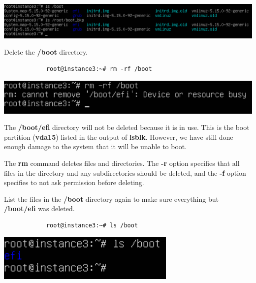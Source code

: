 \documentclass[letterpaper, 12pt]{article}
\begin{document}
\begin{enumerate}
\begin{labstep}
        \begin{center}
            \includegraphics[width=\linewidth]{images/part7/step8.png}
        \end{center}
    \end{labstep}

    \begin{labstep}
        Delete the \textbf{/boot} directory.
        \begin{lstlisting}
            root@instance3:~# rm -rf /boot
        \end{lstlisting}

        \begin{center}
            \includegraphics[width=\linewidth]{images/part7/step9.png}
        \end{center}
    \end{labstep}

    \begin{notebox}
        The \textbf{/boot/efi} directory will not be deleted because it is in use.
        This is the boot partition (\textbf{vda15}) listed in the output of \textbf{lsblk}.
        However, we have still done enough damage to the system that it will be unable to boot.
    \end{notebox}
    \begin{notebox}
        The \textbf{rm} command deletes files and directories.
        The \textbf{-r} option specifies that all files in the directory and any subdirectories should be deleted, and the \textbf{-f} option specifies to not ask permission before deleting.
    \end{notebox}

    \begin{labstep}
        List the files in the \textbf{/boot} directory again to make sure everything but \textbf{/boot/efi} was deleted.
        \begin{lstlisting}
            root@instance3:~# ls /boot
        \end{lstlisting}

        \begin{center}
            \includegraphics[width=\linewidth]{images/part7/step10.png}
        \end{center}
    \end{labstep}


\end{enumerate}
\end{document}
